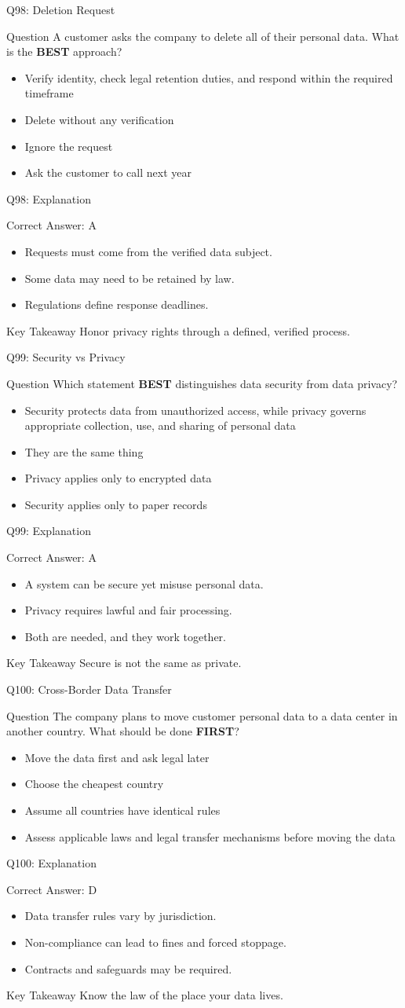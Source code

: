 \documentclass[aspectratio=169]{beamer}
\newcommand{\hq}[7]{%
	\begin{frame}{Q#1: #2}
		\begin{block}{Question}
			#3
		\end{block}
		\begin{itemize}
			#4
		\end{itemize}
	\end{frame}
	\begin{frame}{Q#1: Explanation}
		\begin{block}{Correct Answer: #5}
			\begin{itemize}
				#6
			\end{itemize}
		\end{block}
		\begin{alertblock}{Key Takeaway}
			#7
		\end{alertblock}
	\end{frame}
}
\begin{document}
	\hq{98}{Deletion Request}
	{A customer asks the company to delete all of their personal data. What is the \textbf{BEST} approach?}
	{\item[\textbf{(A)}] Verify identity, check legal retention duties, and respond within the required timeframe
		\item[\textbf{(B)}] Delete without any verification
		\item[\textbf{(C)}] Ignore the request
		\item[\textbf{(D)}] Ask the customer to call next year}
	{A}
	{\item Requests must come from the verified data subject.
		\item Some data may need to be retained by law.
		\item Regulations define response deadlines.}
	{Honor privacy rights through a defined, verified process.}
	
	\hq{99}{Security vs Privacy}
	{Which statement \textbf{BEST} distinguishes data security from data privacy?}
	{\item[\textbf{(A)}] Security protects data from unauthorized access, while privacy governs appropriate collection, use, and sharing of personal data
		\item[\textbf{(B)}] They are the same thing
		\item[\textbf{(C)}] Privacy applies only to encrypted data
		\item[\textbf{(D)}] Security applies only to paper records}
	{A}
	{\item A system can be secure yet misuse personal data.
		\item Privacy requires lawful and fair processing.
		\item Both are needed, and they work together.}
	{Secure is not the same as private.}
	
	\hq{100}{Cross-Border Data Transfer}
	{The company plans to move customer personal data to a data center in another country. What should be done \textbf{FIRST}?}
	{\item[\textbf{(A)}] Move the data first and ask legal later
		\item[\textbf{(B)}] Choose the cheapest country
		\item[\textbf{(C)}] Assume all countries have identical rules
		\item[\textbf{(D)}] Assess applicable laws and legal transfer mechanisms before moving the data}
	{D}
	{\item Data transfer rules vary by jurisdiction.
		\item Non-compliance can lead to fines and forced stoppage.
		\item Contracts and safeguards may be required.}
	{Know the law of the place your data lives.}
	
\end{document}
